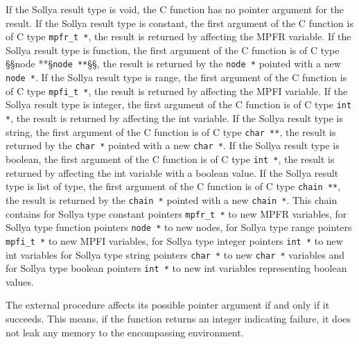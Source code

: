\begin{itemize}
   If the Sollya result type is void, the C function has no pointer
   argument for the result.  If the Sollya result type is constant, the
   first argument of the C function is of C type \texttt{mpfr\_t *}, the result is
   returned by affecting the MPFR variable.  If the Sollya result type
   is function, the first argument of the C function is of C type §§node
   **§\texttt{node **}§§, the result is returned by the \texttt{node *} pointed with a new \texttt{node *}.
   If the Sollya result type is range, the first argument of the C
   function is of C type \texttt{mpfi\_t *}, the result is returned by affecting
   the MPFI variable.  If the Sollya result type is integer, the first
   argument of the C function is of C type \texttt{int *}, the result is returned
   by affecting the int variable.  If the Sollya result type is string,
   the first argument of the C function is of C type \texttt{char **}, the result
   is returned by the \texttt{char *} pointed with a new \texttt{char *}.  If the Sollya
   result type is boolean, the first argument of the C function is of C
   type \texttt{int *}, the result is returned by affecting the int variable with
   a boolean value.  If the Sollya result type is list of type, the
   first argument of the C function is of C type \texttt{chain **}, the result is
   returned by the \texttt{chain *} pointed with a new \texttt{chain *}.  This chain
   contains for Sollya type constant pointers \texttt{mpfr\_t *} to new MPFR
   variables, for Sollya type function pointers \texttt{node *} to new nodes, for
   Sollya type range pointers \texttt{mpfi\_t *}  to new MPFI variables, for
   Sollya type integer pointers \texttt{int *} to new int variables for Sollya
   type string pointers \texttt{char *} to new \texttt{char *} variables and for Sollya
   type boolean pointers \texttt{int *} to new int variables representing boolean
   values.
    	       
   The external procedure affects its possible pointer argument if and
   only if it succeeds.  This means, if the function returns an integer
   indicating failure, it does not leak any memory to the encompassing
   environment.
    

\end{itemize}
